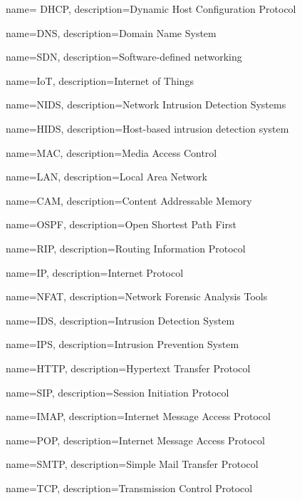 {
    name= DHCP,
    description={Dynamic Host Configuration Protocol}
}

{
    name=DNS,
    description={Domain Name System}
}

{
    name=SDN,
    description={Software-defined networking}
}

{
    name=IoT,
    description={Internet of Things}
}

{
    name=NIDS,
    description={Network Intrusion Detection Systems}
}

{
    name=HIDS,
    description={Host-based intrusion detection system}
}

{
    name=MAC,
    description={Media Access Control}
}

{
    name=LAN,
    description={Local Area Network}
}


{
    name=CAM,
    description={Content Addressable Memory}
}

{
    name=OSPF,
    description={Open Shortest Path First}
}

{
    name=RIP,
    description={Routing Information Protocol}
}

{
    name=IP,
    description={Internet Protocol}
}

{
    name=NFAT,
    description={Network Forensic Analysis Tools}
}

{
    name=IDS,
    description={Intrusion Detection System}
}

{
    name=IPS,
    description={Intrusion Prevention System}
}

{
    name=HTTP,
    description={Hypertext Transfer Protocol}
}

{
    name=SIP,
    description={Session Initiation Protocol}
}

{
    name=IMAP,
    description={Internet Message Access Protocol}
}

{
    name=POP,
    description={Internet Message Access Protocol}
}

{
    name=SMTP,
    description={Simple Mail Transfer Protocol}
}

{
    name=TCP,
    description={Transmission Control Protocol}
}

